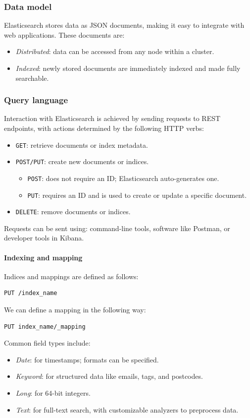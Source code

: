 \subsubsection{Data model}
Elasticsearch stores data as JSON documents, making it easy to integrate with web applications. These documents are:
\begin{itemize}
    \item \textit{Distributed}: data can be accessed from any node within a cluster.
    \item \textit{Indexed}: newly stored documents are immediately indexed and made fully searchable.
\end{itemize}


\subsubsection{Query language}
Interaction with Elasticsearch is achieved by sending requests to REST endpoints, with actions determined by the following HTTP verbs:
\begin{itemize}
    \item \texttt{GET}: retrieve documents or index metadata.
    \item \texttt{POST/PUT}: create new documents or indices.
        \begin{itemize}
            \item \texttt{POST}: does not require an ID; Elasticsearch auto-generates one.
            \item \texttt{PUT}: requires an ID and is used to create or update a specific document.
        \end{itemize}
    \item \texttt{DELETE}: remove documents or indices.
\end{itemize}
Requests can be sent using: command-line tools, software like Postman, or developer tools in Kibana. 

\paragraph*{Indexing and mapping}
Indices and mappings are defined as follows:
\begin{lstlisting}[style=C]
PUT /index_name
\end{lstlisting} 
We can define a mapping in the following way: 
\begin{lstlisting}[style=C]
PUT index_name/_mapping
\end{lstlisting} 
Common field types include:
\begin{itemize}
    \item \textit{Date}: for timestamps; formats can be specified.
    \item \textit{Keyword}: for structured data like emails, tags, and postcodes.
    \item \textit{Long}: for 64-bit integers.
    \item \textit{Text}: for full-text search, with customizable analyzers to preprocess data.
\end{itemize}


